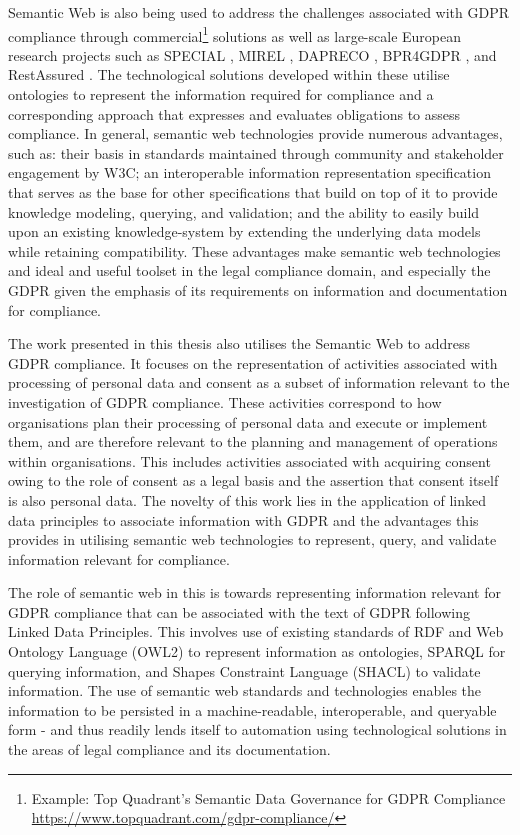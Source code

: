 Semantic Web is also being used to address the challenges associated with GDPR compliance through commercial\footnote{Example: Top Quadrant's Semantic Data Governance for GDPR Compliance \url{https://www.topquadrant.com/gdpr-compliance/}} solutions as well as large-scale European research projects such as SPECIAL \cite{SPECIAL}, MIREL \cite{MIREL}, DAPRECO \cite{DAPRECO}, BPR4GDPR \cite{BPR4GDPR}, and RestAssured \cite{RestAssured}.
The technological solutions developed within these utilise ontologies to represent the information required for compliance and a corresponding approach that expresses and evaluates obligations to assess compliance.
In general, semantic web technologies provide numerous advantages, such as: their basis in standards maintained through community and stakeholder engagement by W3C; an interoperable information representation specification that serves as the base for other specifications that build on top of it to provide knowledge modeling, querying, and validation; and the ability to easily build upon an existing knowledge-system by extending the underlying data models while retaining compatibility. These advantages make semantic web technologies and ideal and useful toolset in the legal compliance domain, and especially the GDPR given the emphasis of its requirements on information and documentation for compliance.

The work presented in this thesis also utilises the Semantic Web to address GDPR compliance. It focuses on the representation of activities associated with processing of personal data and consent as a subset of information relevant to the investigation of GDPR compliance. These activities correspond to how organisations plan their processing of personal data and execute or implement them, and are therefore relevant to the planning and management of operations within organisations.
This includes activities associated with acquiring consent owing to the role of consent as a legal basis and the assertion that consent itself is also personal data.
The novelty of this work lies in the application of linked data principles to associate information with GDPR and the advantages this provides in utilising semantic web technologies to represent, query, and validate information relevant for compliance.

The role of semantic web in this is towards representing information relevant for GDPR compliance that can be associated with the text of GDPR following Linked Data Principles.
This involves use of existing standards of RDF \cite{RDF} and Web Ontology Language (OWL2) \cite{OWL} to represent information as ontologies, SPARQL \cite{SPARQL} for querying information, and Shapes Constraint Language (SHACL) \cite{SHACL} to validate information.
The use of semantic web standards and technologies enables the information to be persisted in a machine-readable, interoperable, and queryable form - and thus readily lends itself to automation using technological solutions in the areas of legal compliance and its documentation.

